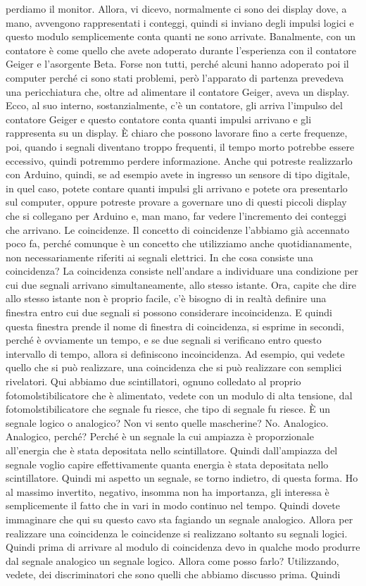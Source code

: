 {perdiamo il monitor. Allora, vi dicevo, normalmente ci sono dei display dove, a mano, avvengono rappresentati i conteggi, quindi si inviano degli impulsi logici e questo modulo semplicemente conta quanti ne sono arrivate. Banalmente, con un contatore è come quello che avete adoperato durante l'esperienza con il contatore Geiger e l'asorgente Beta. Forse non tutti, perché alcuni hanno adoperato poi il computer perché ci sono stati problemi, però l'apparato di partenza prevedeva una pericchiatura che, oltre ad alimentare il contatore Geiger, aveva un display. Ecco, al suo interno, sostanzialmente, c'è un contatore, gli arriva l'impulso del contatore Geiger e questo contatore conta quanti impulsi arrivano e gli rappresenta su un display. È chiaro che possono lavorare fino a certe frequenze, poi, quando i segnali diventano troppo frequenti, il tempo morto potrebbe essere eccessivo, quindi potremmo perdere informazione. Anche qui potreste realizzarlo con Arduino, quindi, se ad esempio avete in ingresso un sensore di tipo digitale, in quel caso, potete contare quanti impulsi gli arrivano e potete ora presentarlo sul computer, oppure potreste provare a governare uno di questi piccoli display che si collegano per Arduino e, man mano, far vedere l'incremento dei conteggi che arrivano. Le coincidenze. Il concetto di coincidenze l'abbiamo già accennato poco fa, perché comunque è un concetto che utilizziamo anche quotidianamente, non necessariamente riferiti ai segnali elettrici. In che cosa consiste una coincidenza? La coincidenza consiste nell'andare a individuare una condizione per cui due segnali arrivano simultaneamente, allo stesso istante. Ora, capite che dire allo stesso istante non è proprio facile, c'è bisogno di in realtà definire una finestra entro cui due segnali si possono considerare incoincidenza. E quindi questa finestra prende il nome di finestra di coincidenza, si esprime in secondi, perché è ovviamente un tempo, e se due segnali si verificano entro questo intervallo di tempo, allora si definiscono incoincidenza. Ad esempio, qui vedete quello che si può realizzare, una coincidenza che si può realizzare con semplici rivelatori. Qui abbiamo due scintillatori, ognuno colledato al proprio fotomolstibilicatore che è alimentato, vedete con un modulo di alta tensione, dal fotomolstibilicatore che segnale fu riesce, che tipo di segnale fu riesce. È un segnale logico o analogico? Non vi sento quelle mascherine? No. Analogico. Analogico, perché? Perché è un segnale la cui ampiazza è proporzionale all'energia che è stata depositata nello scintillatore. Quindi dall'ampiazza del segnale voglio capire effettivamente quanta energia è stata depositata nello scintillatore. Quindi mi aspetto un segnale, se torno indietro, di questa forma. Ho al massimo invertito, negativo, insomma non ha importanza, gli interessa è semplicemente il fatto che in vari in modo continuo nel tempo. Quindi dovete immaginare che qui su questo cavo sta fagiando un segnale analogico. Allora per realizzare una coincidenza le coincidenze si realizzano soltanto su segnali logici. Quindi prima di arrivare al modulo di coincidenza devo in qualche modo produrre dal segnale analogico un segnale logico. Allora come posso farlo? Utilizzando, vedete, dei discriminatori che sono quelli che abbiamo discusso prima. Quindi }
